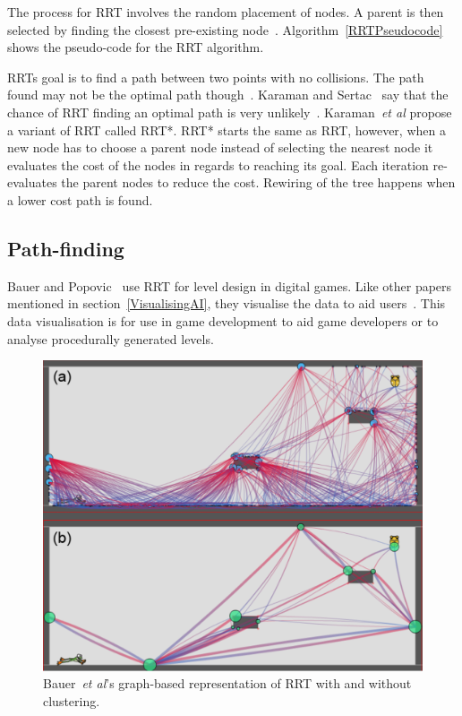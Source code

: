 \documentclass[journal]{IEEEtran}
\begin{document}
	The process for RRT involves the random placement of nodes. A parent is then selected by finding the closest pre-existing node~\cite{Kuffner2000}. Algorithm~\ref{RRTPseudocode} shows the pseudo-code for the RRT algorithm. 
	
	RRTs goal is to find a path between two points with no collisions. The path found may not be the optimal path though~\cite{Kuffner2000, Karaman2011}. Karaman and Sertac~\cite{karaman2010} say that the chance of RRT finding an optimal path is very unlikely~\cite{karaman2010, Tremblay2014}.  Karaman~\textit{et al} propose a variant of RRT called RRT*. RRT* starts the same as RRT, however, when a new node has to choose a parent node instead of selecting the nearest node it evaluates the cost of the nodes in regards to reaching its goal. Each iteration re-evaluates the parent nodes to reduce the cost. Rewiring of the tree happens when a lower cost path is found.
	
	\subsection{Path-finding} \label{Pathfinding}
	Bauer and Popovic~\cite{bauer2012} use RRT for level design in digital games. Like other papers mentioned in section~\ref{VisualisingAI}, they visualise the data to aid users~\cite{bauer2012, Haworth2010}. This data visualisation is for use in game development to aid game developers or to analyse procedurally generated levels. 
	
	\begin{figure}[h]
		\includegraphics[width=1.0\linewidth]{BauerRRT.png}
		\caption{ Bauer~\textit{et al}'s\cite{bauer2012} graph-based representation of RRT with and without clustering.}
		\label{BauerRRT}
	\end{figure} 
	
\end{document}
